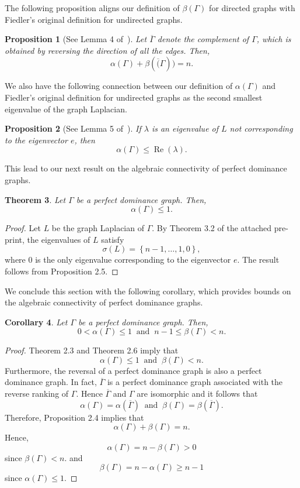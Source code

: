 \documentclass{article}
\newtheorem{theorem}{Theorem}[section]
\newtheorem{proposition}[theorem]{Proposition}
\newtheorem{corollary}[theorem]{Corollary}
\newcommand*\conj[1]{\overline{#1}}
\newcommand\re[1]{\operatorname{Re}\left(#1\right)}
\begin{document}
The following proposition aligns our definition of $\beta(\Gamma)$ for directed graphs with Fiedler's original definition for undirected graphs.

\begin{proposition}[See Lemma 4 of~\cite{Wu2005-1}]
Let $\conj{\Gamma}$ denote the complement of $\Gamma$, which is obtained by reversing the direction of all the edges.
Then,
\[
\alpha(\Gamma)+\beta(\conj(\Gamma))=n.
\]
\end{proposition}

We also have the following connection between our definition of $\alpha(\Gamma)$ and Fiedler's original definition for undirected graphs as the second smallest eigenvalue of the graph Laplacian.

\begin{proposition}[See Lemma 5 of~\cite{Wu2005-1}]
If $\lambda$ is an eigenvalue of $L$ not corresponding to the eigenvector $e$, then
\[
\alpha(\Gamma)\leq\re{\lambda}.
\]
\end{proposition}

This lead to our next result on the algebraic connectivity of perfect dominance graphs.

\begin{theorem}
Let $\Gamma$ be a perfect dominance graph.
Then,
\[
\alpha(\Gamma)\leq 1.
\]
\end{theorem}
\begin{proof}
Let $L$ be the graph Laplacian of $\Gamma$. 
By Theorem 3.2 of the attached pre-print, the eigenvalues of $L$ satisfy
\[
\sigma(L)=\left\{n-1,\ldots,1,0\right\},
\]
where $0$ is the only eigenvalue corresponding to the eigenvector $e$. 
The result follows from Proposition 2.5.
\end{proof}

We conclude this section with the following corollary, which provides bounds on the algebraic connectivity of perfect dominance graphs. 

\begin{corollary}
Let $\Gamma$ be a perfect dominance graph.
Then,
\[
0<\alpha(\Gamma)\leq 1
~\text{ and }~
n-1\leq \beta(\Gamma) < n.
\]
\end{corollary}
\begin{proof}
Theorem 2.3 and Theorem 2.6 imply that
\[
\alpha(\Gamma)\leq 1
~\text{ and }~
\beta(\Gamma)<n.
\]
Furthermore, the reversal of a perfect dominance graph is also a perfect dominance graph.
In fact, $\conj{\Gamma}$ is a perfect dominance graph associated with the reverse ranking of $\Gamma$.
Hence $\conj{\Gamma}$ and $\Gamma$ are isomorphic and it follows that 
\[
\alpha(\Gamma)=\alpha(\conj{\Gamma})
~\text{ and }~
\beta(\Gamma)=\beta(\conj{\Gamma}).
\]
Therefore, Proposition 2.4 implies that
\[
\alpha(\Gamma)+\beta(\Gamma)=n.
\]
Hence,
\[
\alpha(\Gamma)=n-\beta(\Gamma)>0
\]
since $\beta(\Gamma)<n$. and
\[
\beta(\Gamma)=n-\alpha(\Gamma)\geq n-1
\]
since $\alpha(\Gamma)\leq 1$. 
\end{proof}
\end{document}
